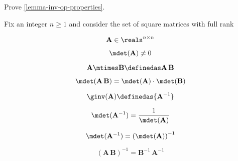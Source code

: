 \begin{gradedexercise}
Prove \cref{lemma-inv-op-properties}.
\end{gradedexercise}

\begin{example}\label{exa:square-full}

Fix an integer $n\geq1 $ and consider the set of square matrices with full rank


\begin{equation} \label{eq:group-fullrank-issquare}
    \mathbf{A} \in \reals^{n\times n}
\end{equation}

\begin{equation} \label{eq:group-fullrank-isfullrank}
   \mdet(\mathbf{A}) \neq 0
\end{equation}


\begin{equation} \label{eq:group-fullrank-composition}
   \mathbf{A} \mtimes \mathbf{B}  \definedas \mathbf{A}\,\mathbf{B}
\end{equation}


\begin{equation} \label{eq:group-fullrank-composition-det}
   \mdet(\mathbf{A} \, \mathbf{B}) = \mdet(\mathbf{A}) \cdot  \mdet(\mathbf{B})
\end{equation}

\begin{equation} \label{eq:group-fullrank-inverse}
   \ginv(\mathbf{A}) \definedas {\mathbf{A}^{-1}}
\end{equation}


\begin{equation} \label{eq:group-fullrank-inverse-det}
   \mdet(\mathbf{A}^{-1}) = \frac{1}{\mdet(\mathbf{A})}
\end{equation}

\begin{equation} \label{eq:group-fullrank-inverse-det2}
   \mdet(\mathbf{A}^{-1}) = \left( \mdet(\mathbf{A}) \right) ^ {-1}
\end{equation}

\begin{equation} \label{eq:group-fullrank-inverse-comp}
   (\mathbf{A}\,\mathbf{B})^{-1} = {\mathbf{B}^{-1} \, \mathbf{A}^{-1}}
\end{equation}

\end{example}








